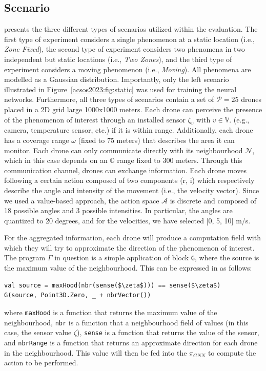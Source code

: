 \subsection{Scenario}
 presents the three different types of scenarios utilized within the evaluation. 
 The first type of experiment considers a single phenomenon at a static location (i.e., \emph{Zone Fixed}), 
 the second type of experiment considers two phenomena in two independent but static locations (i.e., \emph{Two Zones}), 
 and the third type of experiment considers a moving phenomenon (i.e., \emph{Moving}). 
 All phenomena are modelled as a Gaussian distribution. 
 Importantly, only the left scenario illustrated in Figure~\ref{acsos2023:fig:static} was used for training the neural networks. 
Furthermore, all three types of scenarios contain a set of $\mathcal{P} = 25$ drones placed in a 2D grid large 1000x1000 meters. %
Each drone can perceive the presence
 of the phenomenon of interest through an installed sensor $\zeta_v$ with $v \in \mathbb{V}$. 
 (e.g., camera, temperature sensor, etc.) if it is within range.
%
Additionally, each drone has a coverage range $\omega$ (fixed to 75 meters) 
 that describes the area it can monitor. 
 Each drone can only communicate directly with its neighbourhood $\mathcal{N}$, 
 which in this case depends on an $\mathbb{O}$ range fixed to 300 meters. %
Through this communication channel, drones can exchange information. 
%
Each drone moves following a certain action composed of two components (r, i) 
 which respectively describe the angle and intensity of the movement (i.e., the velocity vector).
Since we used a value-based approach, 
 the action space $\mathcal{A}$ is discrete and composed of 18 possible angles and 3 possible intensities.
In particular, the angles are quantized to 20 degrees, and for the velocities, we have selected [0, 5, 10] m/s.
%

For the aggregated information, each drone will produce a computation field with which they will try to approximate the direction of the phenomenon of interest. 
%
%
The program $\Gamma$ in question is a simple application of block \lstinline|G|, where the source is the maximum value of the neighbourhood. 
This can be expressed in \scafi{} as follows:
\begin{lstlisting}[mathescape=true]
val source = maxHood(nbr(sense($\zeta$))) == sense($\zeta$)
G(source, Point3D.Zero, _ + nbrVector())
\end{lstlisting}
where \texttt{maxHood} is a function that returns the maximum value of the neighbourhood, 
 \texttt{nbr} is a function that a neighbourhood field of values (in this case, the sensor value $\zeta$),
\texttt{sense} is a function that returns the value of the sensor, and
\texttt{nbrRange} is a function that returns an approximate direction for each drone in the neighbourhood.
%
This value will then be fed into the $\pi_{GNN}$ to compute the action to be performed.
